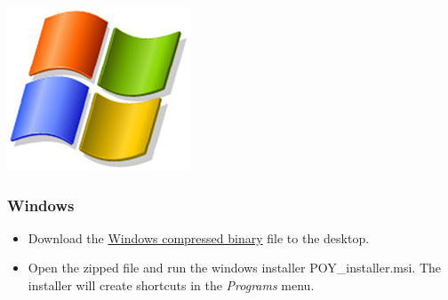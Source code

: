 \begin{flushleft}
	\begin{minipage}[c]{0.074\textwidth}
	   	\includegraphics[width=\textwidth]{figures/figLogoWindows.jpg}
	\end{minipage}
	\quad
	\begin{minipage}[t]{0.88\textwidth}
		   	\subsubsection{Windows}
	\end{minipage}
		\begin{itemize}
			\item
                Download the
                \href{http://research.amnh.org/scicomp/projects/poy.php}{Windows compressed binary} file to the desktop.

			\item 
                Open the zipped file and run the windows installer
                POY\_installer.msi. The installer will create shortcuts in the
                \emph{Programs} menu.
		\end{itemize}


\end{flushleft}

